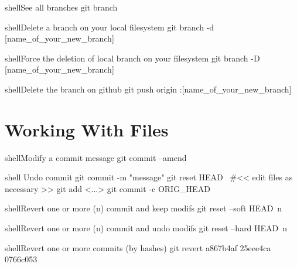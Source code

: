 \documentclass[10pt,a4paper]{article}
\begin{document}
\begin{multicols}{3}
\begin{codebox}{shell}{See all branches}
git branch

\end{codebox}

\begin{codebox}{shell}{Delete a branch on your local filesystem}
git branch -d [name_of_your_new_branch]

\end{codebox}

\begin{codebox}{shell}{Force the deletion of local branch on your filesystem}
git branch -D [name_of_your_new_branch]

\end{codebox}

\begin{codebox}{shell}{Delete the branch on github}
git push origin :[name_of_your_new_branch]

\end{codebox}

\section{Working With Files}

\begin{codebox}{shell}{Modify a commit message}
git commit --amend

\end{codebox}

\begin{codebox}{shell}{}
Undo commit
git commit -m "message"
git reset HEAD~
#<< edit files as necessary >>
git add <...>
git commit -c ORIG_HEAD

\end{codebox}

\begin{codebox}{shell}{Revert one or more (n) commit and keep modifs}
git reset --soft HEAD~n

\end{codebox}

\begin{codebox}{shell}{Revert one or more (n) commit and undo modifs}
git reset --hard HEAD~n

\end{codebox}

\begin{codebox}{shell}{Revert one or more commits (by hashes)}
git revert a867b4af 25eee4ca 0766c053

\end{codebox}


\end{multicols}
\end{document}
